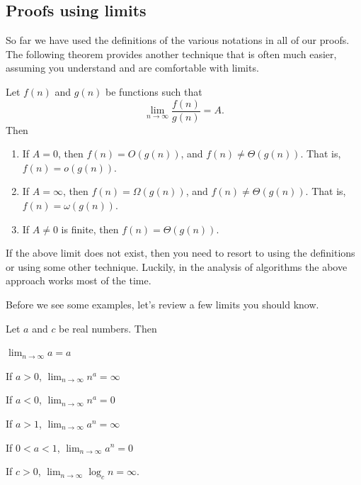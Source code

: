 \subsection{Proofs using limits}\label{subsec:limproof}
So far we have used the definitions of the various notations in all of our proofs. 
The following theorem provides another technique that is often much easier,
assuming you understand and are comfortable with limits.

\begin{thm}\label{thm:limits}
Let $f(n)$ and $g(n)$ be functions such that 
$$\lim_{n\rightarrow \infty}\frac{f(n)}{g(n)} = A.$$
Then
\begin{enumerate}
\item If $A=0$, then $f(n)=O(g(n))$, and $f(n)\neq \Theta(g(n))$.  That is, $f(n)=o(g(n))$.
\item If $A=\infty$, then $f(n)=\Omega(g(n))$, and $f(n)\neq \Theta(g(n))$. That is, $f(n)=\omega(g(n))$.
\item If $A\neq 0$ is finite, then $f(n)=\Theta(g(n))$. 
\end{enumerate}
\end{thm}

If the above limit does not exist, then you need to resort to
using the definitions or using some other technique.  
Luckily, in the analysis of algorithms the above approach works most of the time.

Before we see some examples, let's review a few limits you should know.

\begin{thm}\label{limitProps1}
Let $a$ and $c$ be real numbers.  Then
\begin{lenum}
\item $\displaystyle \lim_{n\rightarrow \infty} a = a$
\item If $a>0$, $\displaystyle \lim_{n\rightarrow \infty} n^a = \infty$
\item If $a<0$, $\displaystyle \lim_{n\rightarrow \infty} n^a = 0$
\item If $a>1$, $\displaystyle \lim_{n\rightarrow \infty} a^n = \infty$
\item If $0<a<1$, $\displaystyle \lim_{n\rightarrow \infty} a^n = 0$
\item If $c>0$, $\displaystyle \lim_{n\rightarrow \infty} \log_c n = \infty$.
\end{lenum}
\end{thm}
 
